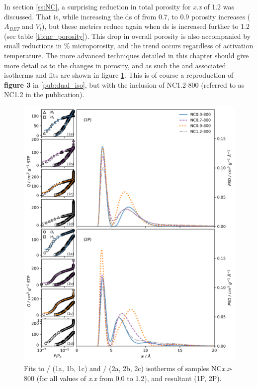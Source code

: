 In section \ref{ss:NC}, a surprising reduction in total porosity for \textit{x.x} of 1.2 was discussed. That is, while increasing the \acrfull{ds} of  from 0.7, to 0.9 porosity increases ($A_{BET}$ and $V_t$), but these metrics reduce again when \acrshort{ds} is increased further to 1.2 (see table \ref{tb:nc_porosity}). This drop in overall porosity is also accompanied by small reductions in \% microporosity, and the trend occurs regardless of activation temperature. The more advanced techniques detailed in this chapter should give more detail as to the changes in porosity, and as such the  and associated isotherms and fits are shown in figure \ref{fig:NC_contraction}. This is of course a reproduction of \textbf{figure 3} in \ref{pub:dual_iso}, but with the inclusion of NC1.2-800 (referred to as NC1.2 in the publication).  

\begin{figure}[ht!]
    \centering
    \includegraphics[width=\columnwidth,keepaspectratio]{5-dual_isotherm/figs/NCdual_isopsd.png}
    \caption{Fits to / (1a, 1b, 1c) and / (2a, 2b, 2c) isotherms of samples NC\textit{x.x}-800 (for all values of \textit{x.x} from 0.0 to 1.2), and resultant  (1P, 2P).}
    \label{fig:NC_contraction}
\end{figure}


